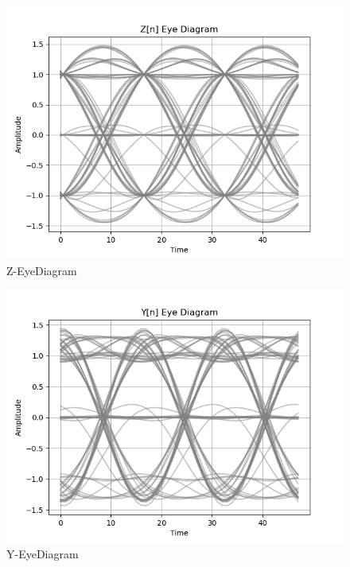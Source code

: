 \documentclass[
	letterpaper, %
	10pt, %
]{CSUniSchoolLabReport}
\begin{document}
\begin{figure}[H] %
	\centering %
	\includegraphics[width=1.2\textwidth]{assignment1a.png} %
	\caption{Z-EyeDiagram}
	\label{fig:block}
\end{figure}

\begin{figure}[H] %
	\centering %
	\includegraphics[width=1.2\textwidth]{assignment1b.png} %
	\caption{Y-EyeDiagram}
	\label{fig:block}
\end{figure}
\end{document}
